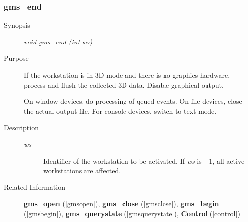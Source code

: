 \subsubsection{gms\_end\label{gmsend}}
\begin{description}
\item[Synopsis]\mbox{}


{\em void    gms\_end (int  ws)\/}
\item[Purpose]\mbox{}


If the workstation is in 3D mode and there is no
graphics hardware, process and flush the collected 3D data.
Disable graphical output.

On window devices, do processing of qeued events.
On file devices, close the actual output
file.
For console devices, switch to text  mode.

\item[Description]\mbox{}


\begin{description}
\item[{\em ws\/}]\mbox{}

 Identifier of the workstation to be activated.
If {\em ws\/} is $-1$, all active workstations
are affected. 
\end{description}

\item[Related Information]\mbox{}


{\bf gms\_open} (\ref{gmsopen}), 
{\bf gms\_close} (\ref{gmsclose}), 
{\bf gms\_begin} (\ref{gmsbegin}), 
{\bf gms\_querystate} (\ref{gmsquerystate}),
{\bf Control} (\ref{control})
\end{description}



\newpage




